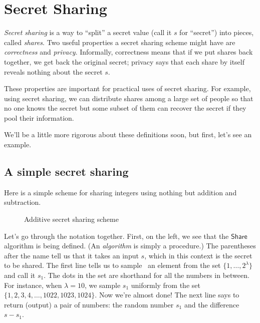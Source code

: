 \section{Secret Sharing}\label{sec:ss}
\emph{Secret sharing} is a way to ``split'' a secret value (call it $s$ for 
``secret'') into pieces, called \emph{shares}. 
Two useful properties a secret sharing scheme might have are \emph{correctness} and 
\emph{privacy}. Informally, correctness means that if we put shares back together, 
we get back the original secret; privacy says that each share by itself reveals 
nothing about the secret $s$. 

These properties are important for practical uses of secret sharing. For 
example, using secret sharing, we can distribute shares among a large set of people so that no one 
knows the secret but some subset of them can recover the secret if they 
pool their information.

We'll be a little more rigorous about these definitions soon, but first, let's 
see an example.  

\subsection{A simple secret sharing}

Here is a simple scheme for sharing integers using nothing but addition and subtraction.

\def\share{\ensuremath{\mathsf{Share}}}
\def\rec{\ensuremath{\mathsf{Rec}}}

\begin{figure}[h!]
\begin{pchstack}[center]
\fbox{%
\procedure{$\share(s)$}{%
    s_1 \sample \{1, \ldots, 2^\lambda\} \\
    \pcreturn (s_1, s - s_1)
}
\pchspace
\procedure{$\rec(s_1, s_2)$}{%
    \pcreturn s_1 + s_2
}
}
\end{pchstack}
\caption{Additive secret sharing scheme}
\label{fig:additiveSS}
\end{figure}

Let's go through the notation together. First, on the left, we see that 
the $\share$ algorithm is being defined. (An \emph{algorithm} is simply a procedure.)
The parentheses after the name tell us that it takes an input $s$, which in 
this context is the secret to be shared. The first line tells us to sample\footnotemark~
an element from the set $\{1, \ldots, 2^\lambda\}$ and call it $s_1$. The 
dots in the set are shorthand for all the numbers in between. For instance, 
when $\lambda=10$, we sample $s_1$ uniformly from the set $\{1, 2, 3, 4, \ldots, 
1022,1023, 1024\}$. Now we're almost done! The next line says to return 
(output) a pair of numbers: the random number $s_1$ and the difference $s-s_1$.

